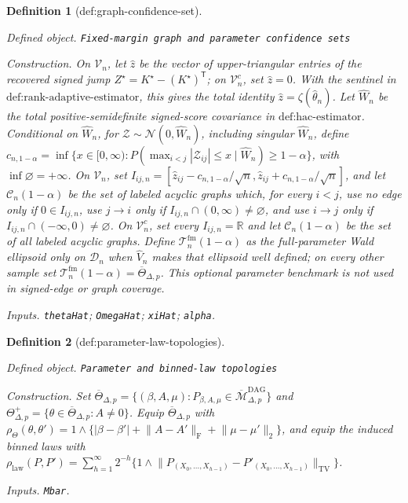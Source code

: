 \documentclass{article}
\newtheorem{definition}{Definition}
\begin{document}
\begin{definition}[def:graph-confidence-set]\label{def:graph-confidence-set}
\par\smallskip\noindent\emph{Defined object.} \texttt{Fixed-\allowbreak{}margin graph and parameter confidence sets}
\par\smallskip\noindent\emph{Construction.} On \(\mathcal V_n\), let \(\widehat z\) be the vector of upper-triangular entries of the recovered signed jump \(Z^\star=K^\star-(K^\star)^{\mathsf T}\); on \(\mathcal V_n^c\), set \(\widehat z=0\). With the sentinel in \(\text{def:rank-adaptive-estimator}\), this gives the total identity \(\widehat z=\zeta(\widehat\theta_n)\). Let \(\widehat W_n\) be the total positive-semidefinite signed-score covariance in \(\text{def:hac-estimator}\). Conditional on \(\widehat W_n\), for \(\mathcal Z\sim\mathcal N(0,\widehat W_n)\), including singular \(\widehat W_n\), define \(c_{n,1-\alpha}=\inf\{x\in[0,\infty):P(\max_{i<j}|\mathcal Z_{ij}|\leq x\mid\widehat W_n)\geq1-\alpha\}\), with \(\inf\varnothing=+\infty\). On \(\mathcal V_n\), set \(I_{ij,n}=[\widehat z_{ij}-c_{n,1-\alpha}/\sqrt n,\widehat z_{ij}+c_{n,1-\alpha}/\sqrt n]\), and let \(\mathcal C_n(1-\alpha)\) be the set of labeled acyclic graphs which, for every \(i<j\), use no edge only if \(0\in I_{ij,n}\), use \(j\to i\) only if \(I_{ij,n}\cap(0,\infty)\neq\varnothing\), and use \(i\to j\) only if \(I_{ij,n}\cap(-\infty,0)\neq\varnothing\). On \(\mathcal V_n^c\), set every \(I_{ij,n}=\mathbb R\) and let \(\mathcal C_n(1-\alpha)\) be the set of all labeled acyclic graphs. Define \(\mathcal T_n^{\mathrm{fm}}(1-\alpha)\) as the full-parameter Wald ellipsoid only on \(\mathcal D_n\) when \(\widehat V_n\) makes that ellipsoid well defined; on every other sample set \(\mathcal T_n^{\mathrm{fm}}(1-\alpha)=\overline\Theta_{\Delta,p}\). This optional parameter benchmark is not used in signed-edge or graph coverage.
\par\smallskip\noindent\emph{Inputs.} \texttt{thetaHat}; \texttt{OmegaHat}; \texttt{xiHat}; \texttt{alpha}.
\end{definition}

\begin{definition}[def:parameter-law-topologies]\label{def:parameter-law-topologies}
\par\smallskip\noindent\emph{Defined object.} \texttt{Parameter and binned-\allowbreak{}law topologies}
\par\smallskip\noindent\emph{Construction.} Set \(\overline\Theta_{\Delta,p}=\{(\beta,A,\mu):P_{\beta,A,\mu}\in\overline{\mathcal M}_{\Delta,p}^{\mathrm{DAG}}\}\) and \(\Theta_{\Delta,p}^{+}=\{\theta\in\overline\Theta_{\Delta,p}:A\neq0\}\). Equip \(\overline\Theta_{\Delta,p}\) with \(\rho_{\Theta}(\theta,\theta')=1\wedge\{|\beta-\beta'|+\lVert A-A'\rVert_{\mathrm F}+\lVert\mu-\mu'\rVert_2\}\), and equip the induced binned laws with \(\rho_{\mathrm{law}}(P,P')=\sum_{h=1}^{\infty}2^{-h}\{1\wedge\lVert P_{(X_0,\ldots,X_{h-1})}-P'_{(X_0,\ldots,X_{h-1})}\rVert_{\mathrm{TV}}\}\).
\par\smallskip\noindent\emph{Inputs.} \texttt{Mbar}.
\end{definition}
\end{document}
